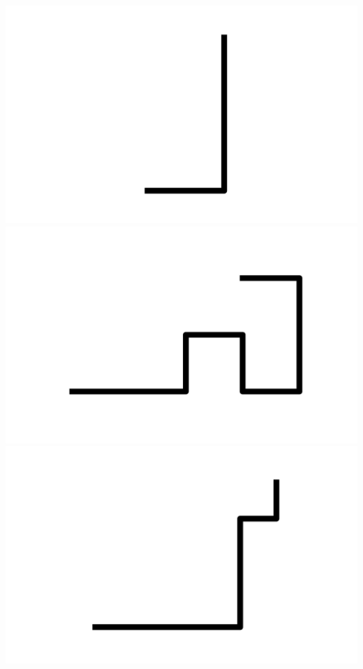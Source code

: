 \documentclass[]{report}
\begin{document}
\includegraphics[scale=.1]{pictures/21/state_cluster_shapes_460.pdf} 
\includegraphics[scale=.1]{pictures/21/state_cluster_shapes_461.pdf} 
\includegraphics[scale=.1]{pictures/21/state_cluster_shapes_462.pdf} 
\end{document}
